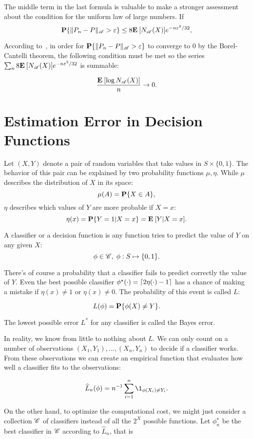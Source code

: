 The middle term in the last formula is valuable to make a stronger assessment about the condition for the uniform law of large numbers. If
\[ \P\{\|P_n-P\|_\AA > \varepsilon\} \leq 8 \E[N_\AA(X)] e^{-n\varepsilon^2/32},  \]

According to~\cite{devroye2013probabilistic}, in order for $\P\{\|P_n-P\|_\AA > \varepsilon\}$ to converge to 0 by the Borel-Cantelli theorem, the following condition must be met so the series $\sum_n 8 \E[N_\AA(X)] e^{-n\varepsilon^2/32}$ is summable:

\[ \frac{\E [\log N_\AA(X)]}{n} \to 0. \] 

\section{Estimation Error in Decision Functions}
Let $(X,Y)$ denote a pair of random variables that take values in $S \times \{0,1\}$. The behavior of this pair can be explained by two probability functions $\mu, \eta$. While $\mu$ describes the distribution of $X$ in its space:
\[ \mu(A) = \P\{X \in A\}, \] 
$\eta$ describes which values of $Y$ are more probable if $X = x$:
\[ \eta(x) = \P\{Y = 1 | X = x\} = \E[Y | X = x]. \] 

A classifier or a decision function is any function tries to predict the value of $Y$ on any given $X$:
\[ \phi \in \CC,\; \phi: S \mapsto \{0,1\}. \]

There's of course a probability that a classifier fails to predict correctly the value of $Y$. Even the best possible classifier $\phi^\star(\cdot) = \ceil{2\eta(\cdot) - 1}$ has a chance of making a mistake if $\eta(x) \neq 1$ or $\eta(x) \neq 0$. The probability of this event is called $L$:

\[ L(\phi) = \P\{\phi(X) \neq Y\}. \]

The lowest possible error $L^*$ for any classifier is called the Bayes error.

In reality, we know from little to nothing about $L$. We can only count on a number of observations $(X_1,Y_1), \ldots, (X_n, Y_n)$ to decide if a classifier works. From these observations we can create an empirical function that evaluates how well a classifier fits to the observations:

\[ \widehat{L}_n(\phi) = n^{-1} \sum_{i = 1}^n \1_{\phi(X_i) \neq Y_i}. \] 

On the other hand, to optimize the computational cost, we might just consider a collection $\CC$ of classifiers instead of all the $2^X$ possible functions. Let $\phi_n^\star$ be the best classifier in $\CC$ according to $\widehat{L}_n$, that is

